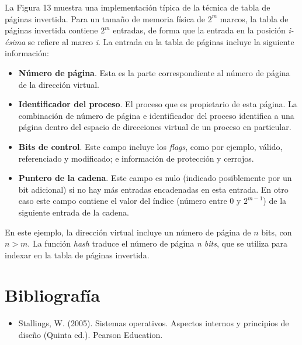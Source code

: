 \documentclass[12pt,a4paper]{article}
\begin{document}
La Figura 13 muestra una implementación típica de la técnica de tabla de páginas invertida. Para un tamaño de memoria física de $2^m$ marcos, la tabla de páginas invertida contiene $2^m$ entradas, de forma que la entrada en la posición \textit{i-ésima} se refiere al marco \textit{i}. La entrada en la tabla de páginas incluye la siguiente información:
\begin{itemize}
    \item \textbf{Número de página}. Esta es la parte correspondiente al número de página de la dirección virtual.
    \item \textbf{Identificador del proceso}. El proceso que es propietario de esta página. La combinación de número de página e identificador del proceso identifica a una página dentro del espacio de direcciones virtual de un proceso en particular.
    \item \textbf{Bits de control}. Este campo incluye los \textit{flags}, como por ejemplo, válido, referenciado y modificado; e información de protección y cerrojos.
\item \textbf{Puntero de la cadena}. Este campo es nulo (indicado posiblemente por un bit adicional) si no hay más entradas encadenadas en esta entrada. En otro caso este campo contiene el valor del índice (número entre $0$ y $2^{m-1}$) de la siguiente entrada de la cadena.
\end{itemize}
En este ejemplo, la dirección virtual incluye un número de página de $n$ bits, con $n > m$. La función \textit{hash} traduce el número de página \textit{n bits}, que se utiliza para indexar en la tabla de páginas invertida.


\section {Bibliografía}
\begin{itemize}
    \item Stallings, W. (2005). Sistemas operativos. Aspectos internos y principios de diseño (Quinta ed.). Pearson Education.
\end{itemize}
\end{document}
